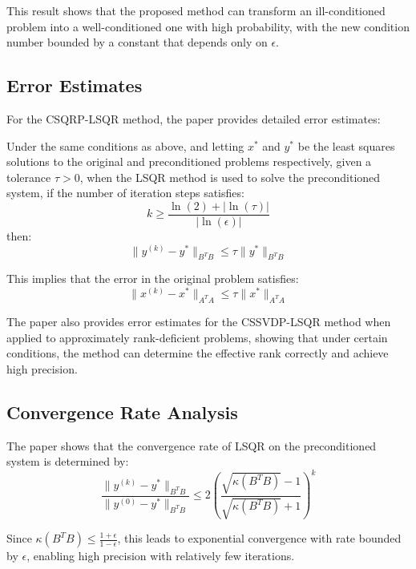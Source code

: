 \documentclass[11pt]{article}
\begin{document}
This result shows that the proposed method can transform an ill-conditioned problem into a well-conditioned one with high probability, with the new condition number bounded by a constant that depends only on $\epsilon$.

\subsection{Error Estimates}

For the CSQRP-LSQR method, the paper provides detailed error estimates:

\begin{theorem}
Under the same conditions as above, and letting $x^*$ and $y^*$ be the least squares solutions to the original and preconditioned problems respectively, given a tolerance $\tau > 0$, when the LSQR method is used to solve the preconditioned system, if the number of iteration steps satisfies:
\begin{equation}
k \geq \frac{\ln(2) + |\ln(\tau)|}{|\ln(\epsilon)|}
\end{equation}
then:
\begin{equation}
\|y^{(k)} - y^*\|_{B^TB} \leq \tau \|y^*\|_{B^TB}
\end{equation}

This implies that the error in the original problem satisfies:
\begin{equation}
\|x^{(k)} - x^*\|_{A^TA} \leq \tau \|x^*\|_{A^TA}
\end{equation}
\end{theorem}

The paper also provides error estimates for the CSSVDP-LSQR method when applied to approximately rank-deficient problems, showing that under certain conditions, the method can determine the effective rank correctly and achieve high precision.

\subsection{Convergence Rate Analysis}

The paper shows that the convergence rate of LSQR on the preconditioned system is determined by:
\begin{equation}
\frac{\|y^{(k)} - y^*\|_{B^TB}}{\|y^{(0)} - y^*\|_{B^TB}} \leq 2\left(\frac{\sqrt{\kappa(B^TB)} - 1}{\sqrt{\kappa(B^TB)} + 1}\right)^k
\end{equation}

Since $\kappa(B^TB) \leq \frac{1+\epsilon}{1-\epsilon}$, this leads to exponential convergence with rate bounded by $\epsilon$, enabling high precision with relatively few iterations.
\end{document}
